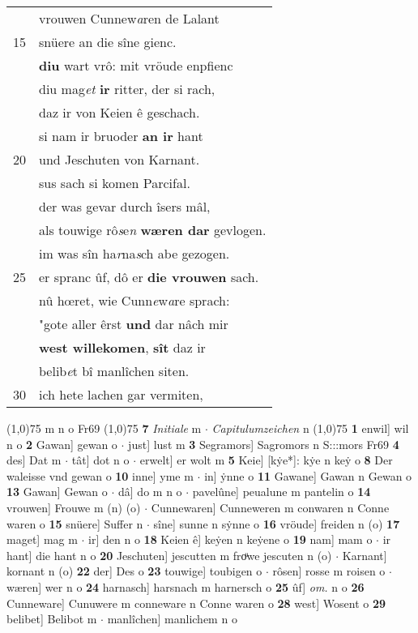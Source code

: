 \documentclass[8pt,a4paper,notitlepage]{article}
\begin{document}
\begin{table}[ht]
\begin{minipage}[t]{0.5\linewidth}
\begin{tabular}{rl}
 & vrouwen Cunnew\textit{a}ren de Lalant\\ 
15 & snüere an die sîne gienc.\\ 
 & \textbf{diu} wart vrô: mit vröude enpfienc\\ 
 & diu mag\textit{et} \textbf{ir} ritter, der si rach,\\ 
 & daz ir von Keien ê geschach.\\ 
 & si nam ir bruoder \textbf{an ir} hant\\ 
20 & und Jeschuten von Karnant.\\ 
 & sus sach si komen Parcifal.\\ 
 & der was gevar durch îsers mâl,\\ 
 & als touwige rô\textit{s}e\textit{n} \textbf{wæren dar} gevlogen.\\ 
 & im was sîn ha\textit{r}na\textit{s}ch abe gezogen.\\ 
25 & er spranc ûf, dô er \textbf{die vrouwen} sach.\\ 
 & nû hœret, wie Cunn\textit{e}w\textit{a}re sprach:\\ 
 & "gote aller êrst \textbf{und} dar nâch mir\\ 
 & \textbf{west willekomen}, \textbf{sît} daz ir\\ 
 & belib\textit{e}t bî manlîchen siten.\\ 
30 & ich hete lachen gar vermiten,\\ 
\end{tabular}
\scriptsize
\line(1,0){75} \newline
m n o Fr69 \newline
\line(1,0){75} \newline
\textbf{7} \textit{Initiale} m   $\cdot$ \textit{Capitulumzeichen} n  \newline
\line(1,0){75} \newline
\textbf{1} enwil] wil n o \textbf{2} Gawan] gewan o  $\cdot$ just] lust m \textbf{3} Segramors] Sagromors n S:::mors Fr69 \textbf{4} des] Dat m  $\cdot$ tât] dot n o  $\cdot$ erwelt] er wolt m \textbf{5} Keie] [kẏe*]: kẏe n keẏ o \textbf{8} Der waleisse vnd gewan o \textbf{10} inne] yme m  $\cdot$ in] ẏnne o \textbf{11} Gawane] Gawan n Gewan o \textbf{13} Gawan] Gewan o  $\cdot$ dâ] do m n o  $\cdot$ pavelûne] peualune m pantelin o \textbf{14} vrouwen] Frouwe m (n) (o)  $\cdot$ Cunnewaren] Cunneweren m conwaren n Conne waren o \textbf{15} snüere] Suffer n  $\cdot$ sîne] sunne n sẏnne o \textbf{16} vröude] freiden n (o) \textbf{17} maget] mag m  $\cdot$ ir] den n o \textbf{18} Keien ê] keẏen n keẏene o \textbf{19} nam] mam o  $\cdot$ ir hant] die hant n o \textbf{20} Jeschuten] jescutten m froͧwe jescuten n (o)  $\cdot$ Karnant] kornant n (o) \textbf{22} der] Des o \textbf{23} touwige] toubigen o  $\cdot$ rôsen] rosse m roisen o  $\cdot$ wæren] wer n o \textbf{24} harnasch] harsnach m harnersch o \textbf{25} ûf] \textit{om.} n o \textbf{26} Cunneware] Cunuwere m conneware n Conne waren o \textbf{28} west] Wosent o \textbf{29} belibet] Belibot m  $\cdot$ manlîchen] manlichem n o \newline
\end{minipage}
\end{table}
\end{document}
